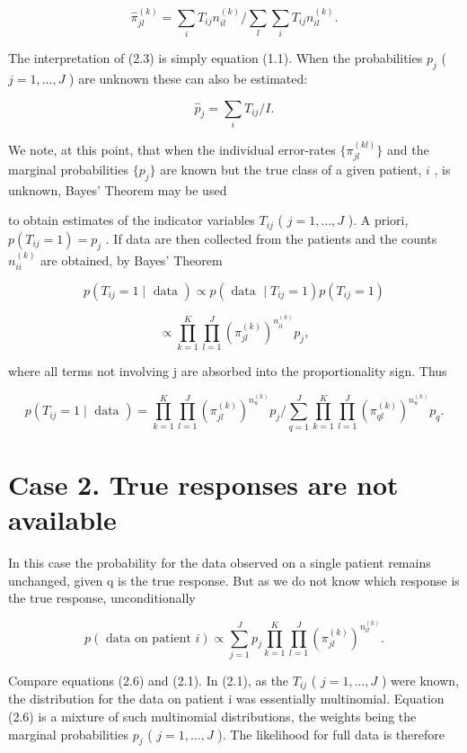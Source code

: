 \documentclass[
]{article}
\begin{document}
\[
\hat {\pi} _ {j l} ^ {(k)} = \sum_ {i} T _ {i j} n _ {i l} ^ {(k)} / \sum_ {l} \sum_ {i} T _ {i j} n _ {i l} ^ {(k)}. \tag {2.3}
\]

The interpretation of (2.3) is simply equation (1.1). When the
probabilities \(p_j\) ( \(j = 1, \dots, J\) ) are unknown these can also
be estimated:

\[
\hat {p} _ {j} = \sum_ {i} T _ {i j} / I. \tag {2.4}
\]

We note, at this point, that when the individual error-rates
\(\{\pi_{jl}^{(kl)}\}\) and the marginal probabilities \(\{p_j\}\) are
known but the true class of a given patient, \(i\) , is unknown, Bayes'
Theorem may be used

to obtain estimates of the indicator variables \(T_{ij}\) (
\(j = 1, \dots, J\) ). A priori, \(p(T_{ij} = 1) = p_j\) . If data are
then collected from the patients and the counts \(n_{ii}^{(k)}\) are
obtained, by Bayes' Theorem

\[
p (T _ {i j} = 1 \mid \text { data }) \propto p (\text { data } \mid T _ {i j} = 1) p (T _ {i j} = 1)
\]

\[
\propto \prod_ {k = 1} ^ {K} \prod_ {l = 1} ^ {J} \left(\pi_ {j l} ^ {(k)}\right) ^ {n _ {i l} ^ {(k)}} p _ {j},
\]

where all terms not involving j are absorbed into the proportionality
sign. Thus

\[
p \left(T _ {i j} = 1 \mid \text { data }\right) = \prod_ {k = 1} ^ {K} \prod_ {l = 1} ^ {J} \left(\pi_ {j l} ^ {(k)}\right) ^ {n _ {u} ^ {(k)}} p _ {j} / \sum_ {q = 1} ^ {J} \prod_ {k = 1} ^ {K} \prod_ {l = 1} ^ {J} \left(\pi_ {q l} ^ {(k)}\right) ^ {n _ {u} ^ {(k)}} p _ {q}. \tag {2.5}
\]

\section{Case 2. True responses are not
available}\label{case-2.-true-responses-are-not-available}

In this case the probability for the data observed on a single patient
remains unchanged, given q is the true response. But as we do not know
which response is the true response, unconditionally

\[
p (\text { data   on   patient } i) \propto \sum_ {j = 1} ^ {J} p _ {j} \prod_ {k = 1} ^ {K} \prod_ {l = 1} ^ {J} \left(\pi_ {j l} ^ {(k)}\right) ^ {n _ {l l} ^ {(k)}}. \tag {2.6}
\]

Compare equations (2.6) and (2.1). In (2.1), as the \(T_{ij}\) (
\(j=1,\ldots,J\) ) were known, the distribution for the data on patient
i was essentially multinomial. Equation (2.6) is a mixture of such
multinomial distributions, the weights being the marginal probabilities
\(p_{j}\) ( \(j=1,\ldots,J\) ). The likelihood for full data is
therefore
\end{document}
